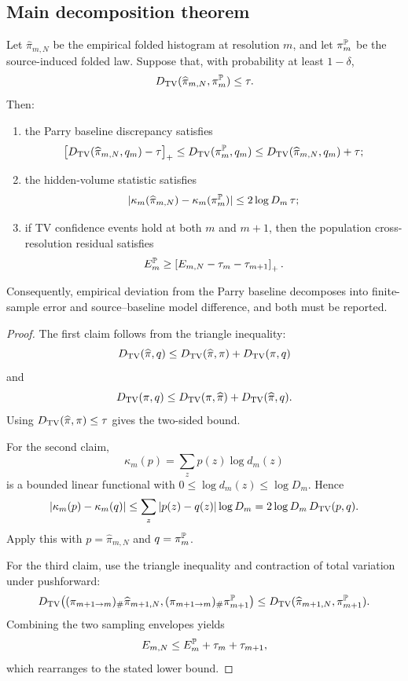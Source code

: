 \subsection{Main decomposition theorem}

\begin{theorem}
\label{thm:statistical-audit-decomposition}
Let \(\widehat\pi_{m,N}\) be the empirical folded histogram at resolution \(m\), and let \(\pi_m^{\mathbb{P}}\) be the source-induced folded law.  Suppose that, with probability at least \(1-\delta\),
\[
D_{\mathrm{TV}}(\widehat\pi_{m,N},\pi_m^{\mathbb{P}})\le\tau.
\]
Then:
\begin{enumerate}[label=(\roman*)]
\item the Parry baseline discrepancy satisfies
\[
\bigl[D_{\mathrm{TV}}(\widehat\pi_{m,N},q_m)-\tau\bigr]_+
\le
D_{\mathrm{TV}}(\pi_m^{\mathbb{P}},q_m)
\le
D_{\mathrm{TV}}(\widehat\pi_{m,N},q_m)+\tau;
\]
\item the hidden-volume statistic satisfies
\[
|\kappa_m(\widehat\pi_{m,N})-\kappa_m(\pi_m^{\mathbb{P}})|
\le
2\log D_m\,\tau;
\]
\item if TV confidence events hold at both \(m\) and \(m+1\), then the population cross-resolution residual satisfies
\[
E_m^{\mathbb{P}}
\ge
\left[E_{m,N}-\tau_m-\tau_{m+1}\right]_+.
\]
\end{enumerate}
Consequently, empirical deviation from the Parry baseline decomposes into finite-sample error and source--baseline model difference, and both must be reported.
\end{theorem}

\begin{proof}
The first claim follows from the triangle inequality:
\[
D_{\mathrm{TV}}(\widehat\pi,q)
\le
D_{\mathrm{TV}}(\widehat\pi,\pi)+D_{\mathrm{TV}}(\pi,q)
\]
and
\[
D_{\mathrm{TV}}(\pi,q)
\le
D_{\mathrm{TV}}(\pi,\widehat\pi)+D_{\mathrm{TV}}(\widehat\pi,q).
\]
Using \(D_{\mathrm{TV}}(\widehat\pi,\pi)\le\tau\) gives the two-sided bound.

For the second claim,
\[
\kappa_m(p)=\sum_zp(z)\log d_m(z)
\]
is a bounded linear functional with \(0\le\log d_m(z)\le\log D_m\).  Hence
\[
|\kappa_m(p)-\kappa_m(q)|
\le
\sum_z|p(z)-q(z)|\log D_m
=
2\log D_m\,D_{\mathrm{TV}}(p,q).
\]
Apply this with \(p=\widehat\pi_{m,N}\) and \(q=\pi_m^{\mathbb{P}}\).

For the third claim, use the triangle inequality and contraction of total variation under pushforward:
\[
D_{\mathrm{TV}}\!\left(
(\pi_{m+1\to m})_\#\widehat\pi_{m+1,N},
(\pi_{m+1\to m})_\#\pi_{m+1}^{\mathbb{P}}
\right)
\le
D_{\mathrm{TV}}(\widehat\pi_{m+1,N},\pi_{m+1}^{\mathbb{P}}).
\]
Combining the two sampling envelopes yields
\[
E_{m,N}\le E_m^{\mathbb{P}}+\tau_m+\tau_{m+1},
\]
which rearranges to the stated lower bound.
\end{proof}
